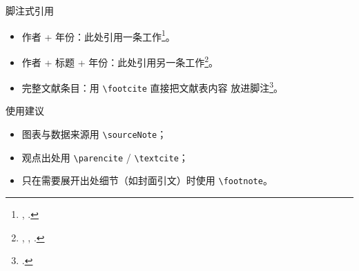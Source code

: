 \begin{frame}{脚注式引用}
  \begin{itemize}
    \item 作者 + 年份：此处引用一条工作\footnote{\citeauthor{example2026},
      \citeyear{example2026}.}。
    \item 作者 + 标题 + 年份：此处引用另一条工作\footnote{\citeauthor{example2026},
      , \citeyear{example2026}.}。
    \item 完整文献条目：用 \texttt{\textbackslash footcite} 直接把文献表内容
      放进脚注\footcite{example2026}。
  \end{itemize}

  \begin{alertblock}{使用建议}
    \begin{itemize}
      \item 图表与数据来源用 \texttt{\textbackslash sourceNote}；
      \item 观点出处用 \texttt{\textbackslash parencite} / \texttt{\textbackslash textcite}；
      \item 只在需要展开出处细节（如封面引文）时使用 \texttt{\textbackslash footnote}。
    \end{itemize}
  \end{alertblock}
\end{frame}
